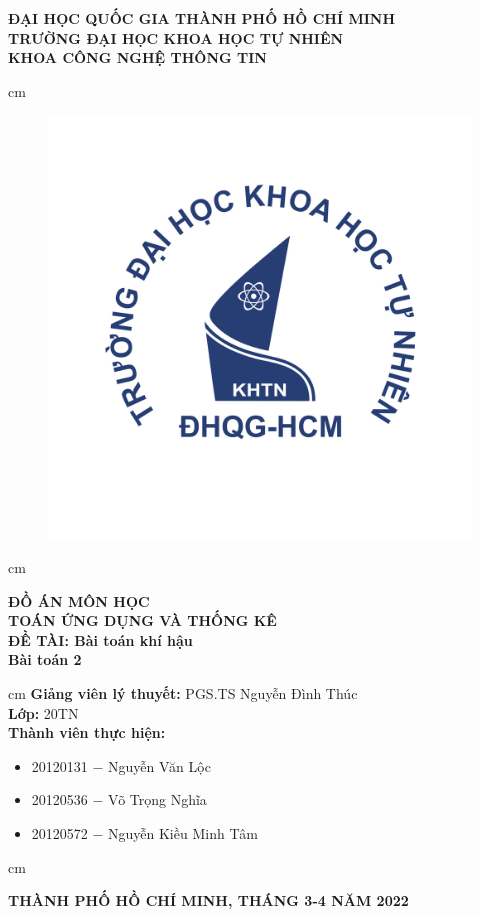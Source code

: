 \documentclass[a4paper]{article}
\author{Nguyễn Văn Lộc}
\begin{document}
\begin{titlepage}
\begin{mybox}
\begin{center}
\fontsize{12}{12}\selectfont
\textbf{ĐẠI HỌC QUỐC GIA THÀNH PHỐ HỒ CHÍ MINH}\\
\textbf{TRƯỜNG ĐẠI HỌC KHOA HỌC TỰ NHIÊN}\\
\textbf{KHOA CÔNG NGHỆ THÔNG TIN}
\end{center}
 cm
\begin{figure}[H]
\begin{center}
\includegraphics[scale=0.25]{images/logo}
\end{center}
\end{figure}
 cm
\begin{center}
\fontsize{18}{14}\selectfont
\textbf{ĐỒ ÁN MÔN HỌC}\\
\fontsize{26}{16}\selectfont
\textbf{TOÁN ỨNG DỤNG VÀ THỐNG KÊ}\\
\fontsize{18}{12}\selectfont
\textbf{ĐỀ TÀI: Bài toán khí hậu}\\
\textbf{Bài toán 2}
\end{center}
 cm
\fontsize{14}{12}\selectfont
\textbf{Giảng viên lý thuyết:} PGS.TS Nguyễn Đình Thúc\\
\textbf{Lớp:} 20TN\\
\textbf{Thành viên thực hiện:}
\begin{itemize}
\item 20120131 $-$ Nguyễn Văn Lộc
\item 20120536 $-$ Võ Trọng Nghĩa
\item 20120572 $-$ Nguyễn Kiều Minh Tâm
\end{itemize}
 cm
\begin{center}
\textbf{THÀNH PHỐ HỒ CHÍ MINH, THÁNG 3-4 NĂM 2022}
\end{center}
\end{mybox}
\end{titlepage}
\tableofcontents
\listoffigures
\listoftables
\newpage
\end{document}
